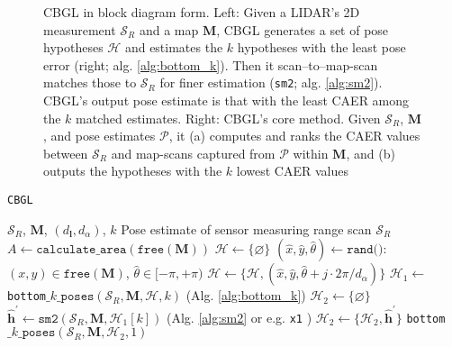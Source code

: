 \begin{figure}\vspace{-0.4cm}
  \hspace{-0.5cm}
  \subfloat{\label{fig:cbgl}     }
  \hspace{-0.99cm}
  \subfloat{\label{fig:bottom_k} }
  \caption{\small CBGL in block diagram form. Left: Given a LIDAR's 2D
           measurement $\mathcal{S}_R$ and a map $\bm{M}$, CBGL generates a set
           of pose hypotheses $\mathcal{H}$ and estimates the $k$ hypotheses
           with the least pose error (right; alg. \ref{alg:bottom_k}). Then it
           scan--to--map-scan matches those to $\mathcal{S}_R$ for finer
           estimation (\texttt{sm2}; alg. \ref{alg:sm2}). CBGL's output pose
           estimate is that with the least CAER among the $k$ matched
           estimates.  Right: CBGL's core method. Given $\mathcal{S}_R$,
           $\bm{M}$, and pose estimates $\mathcal{P}$, it (a) computes and
           ranks the CAER values between $\mathcal{S}_R$ and map-scans captured
           from $\mathcal{P}$ within $\bm{M}$, and (b) outputs the hypotheses
           with the $k$ lowest CAER values}
\vspace{-0.5cm}
  \label{fig:block_system}
\end{figure}


\begin{algorithm}[]
  \caption{\texttt{CBGL}}
  \begin{spacing}{1.0}
  \begin{algorithmic}[1]
    \REQUIRE $\mathcal{S}_R$, $\bm{M}$, $(d_{\bm{l}}, d_\alpha)$, $k$
    \ENSURE Pose estimate of sensor measuring range scan $\mathcal{S}_R$ %
    \STATE $A \leftarrow \texttt{calculate\_area}(\texttt{free}(\bm{M}))$
    \STATE $\mathcal{H} \leftarrow \{\varnothing\}$
      \STATE \small $(\hat{x},\hat{y},\hat{\theta}) \leftarrow \texttt{rand()}$: $(x,y) \in \texttt{free}(\bm{M})$, $\hat{\theta} \in [-\pi,+\pi)$
        \STATE $\mathcal{H} \leftarrow \{\mathcal{H}, (\hat{x}, \hat{y}, \hat{\theta} + j \cdot 2\pi / d_{\alpha})\}$     \label{alg:cbgl:h}
      \ENDFOR
    \ENDFOR
    \STATE $\mathcal{H}_1 \leftarrow$ \texttt{bottom}$\_k\_\texttt{poses}(\mathcal{S}_R, \bm{M}, \mathcal{H}, k)$ \hfill {\small (Alg. \ref{alg:bottom_k}}) \label{alg:cbgl:h1}
    \STATE $\mathcal{H}_2 \leftarrow \{\varnothing \}$
      \STATE $\hat{\bm{h}}^\prime \leftarrow \texttt{sm2}(\mathcal{S}_R, \bm{M}, \mathcal{H}_1[k])$ \hfill {\small (Alg. \ref{alg:sm2} or e.g. \texttt{x1} \cite{Filotheou2023a}})
      \STATE $\mathcal{H}_2 \leftarrow \{\mathcal{H}_2, \hat{\bm{h}}^\prime\}$  \label{alg:cbgl:h2}
    \ENDFOR
    \RETURN \texttt{bottom}$\_k\_\texttt{poses}(\mathcal{S}_R, \bm{M}, \mathcal{H}_2, 1)$
  \end{algorithmic}
  \end{spacing}
  \label{alg:cbgl}
\end{algorithm}

